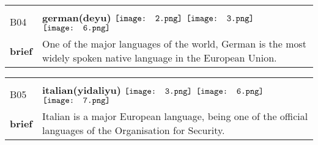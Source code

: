 \documentclass[UTF8]{article}
\begin{document}
            \begin{tabularx}{\textwidth}{p{1.5cm}X}
            \arrayrulecolor{myBlue}
        	\hline\\
            \small{B04}&
            \large{\bfseries{german(deyu)}}\hfill
                                                \phantom{$\vcenter{\hbox{\texttt{[image: 1.png]}}}$}
                                                                $\vcenter{\hbox{\texttt{[image: 2.png]}}}$
                                                                $\vcenter{\hbox{\texttt{[image: 3.png]}}}$
                                                                \phantom{$\vcenter{\hbox{\texttt{[image: 4.png]}}}$}
                                                                \phantom{$\vcenter{\hbox{\texttt{[image: 5.png]}}}$}
                                                                $\vcenter{\hbox{\texttt{[image: 6.png]}}}$
                                                                \phantom{$\vcenter{\hbox{\texttt{[image: 7.png]}}}$}
                                        \\[10pt]
            \large{\bfseries{brief}}&\noindent\parbox[c]{\hsize}{One of the major languages of the world, German is the most widely spoken native language in the European Union.} \\[5pt]
            \hline\\[-10pt]
        \end{tabularx}
            \begin{tabularx}{\textwidth}{p{1.5cm}X}
            \arrayrulecolor{myBlue}
        	\hline\\
            \small{B05}&
            \large{\bfseries{italian(yidaliyu)}}\hfill
                                                \phantom{$\vcenter{\hbox{\texttt{[image: 1.png]}}}$}
                                                                \phantom{$\vcenter{\hbox{\texttt{[image: 2.png]}}}$}
                                                                $\vcenter{\hbox{\texttt{[image: 3.png]}}}$
                                                                \phantom{$\vcenter{\hbox{\texttt{[image: 4.png]}}}$}
                                                                \phantom{$\vcenter{\hbox{\texttt{[image: 5.png]}}}$}
                                                                $\vcenter{\hbox{\texttt{[image: 6.png]}}}$
                                                                $\vcenter{\hbox{\texttt{[image: 7.png]}}}$
                                        \\[10pt]
            \large{\bfseries{brief}}&\noindent\parbox[c]{\hsize}{Italian is a major European language, being one of the official languages of the Organisation for Security.} \\[5pt]
            \hline\\[-10pt]
        \end{tabularx}
\end{document}
